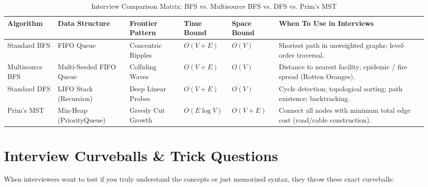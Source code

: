 \documentclass[10pt,journal,compsoc,onecolumn]{IEEEtran}
\begin{document}
\begin{table}[htbp]
\caption{Interview Comparison Matrix: BFS vs. Multisource BFS vs. DFS vs. Prim's MST}
\label{tab:comparison_matrix}
\centering
\begin{tabular}{p{2.6cm}p{2.0cm}p{2.4cm}p{1.8cm}p{1.8cm}p{3.2cm}}
\toprule
\textbf{Algorithm} & \textbf{Data Structure} & \textbf{Frontier Pattern} & \textbf{Time Bound} & \textbf{Space Bound} & \textbf{When To Use in Interviews} \\
\midrule
Standard BFS & FIFO Queue & Concentric Ripples & $O(V + E)$ & $O(V)$ & Shortest path in unweighted graphs; level-order traversal. \\
\midrule
Multisource BFS & Multi-Seeded FIFO Queue & Colliding Waves & $O(V + E)$ & $O(V)$ & Distance to nearest facility; epidemic / fire spread (Rotten Oranges). \\
\midrule
Standard DFS & LIFO Stack (Recursion) & Deep Linear Probes & $O(V + E)$ & $O(V)$ & Cycle detection; topological sorting; path existence; backtracking. \\
\midrule
Prim's MST & Min-Heap (PriorityQueue) & Greedy Cut Growth & $O(E \log V)$ & $O(V + E)$ & Connect all nodes with minimum total edge cost (road/cable construction). \\
\bottomrule
\end{tabular}
\end{table}

\section{Interview Curveballs \& Trick Questions}
\label{sec:curveballs}

When interviewers want to test if you truly understand the concepts or just memorized syntax, they throw these exact curveballs:
\end{document}
